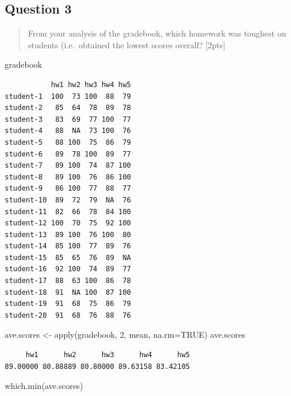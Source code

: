 \documentclass[
  letterpaper,
  DIV=11,
  numbers=noendperiod]{scrartcl}
\newenvironment{Shaded}{\begin{snugshade}}{\end{snugshade}}
\newcommand{\AttributeTok}[1]{\textcolor[rgb]{0.40,0.45,0.13}{#1}}
\newcommand{\ConstantTok}[1]{\textcolor[rgb]{0.56,0.35,0.01}{#1}}
\newcommand{\DecValTok}[1]{\textcolor[rgb]{0.68,0.00,0.00}{#1}}
\newcommand{\FunctionTok}[1]{\textcolor[rgb]{0.28,0.35,0.67}{#1}}
\newcommand{\NormalTok}[1]{\textcolor[rgb]{0.00,0.23,0.31}{#1}}
\newcommand{\OtherTok}[1]{\textcolor[rgb]{0.00,0.23,0.31}{#1}}
\begin{document}
\hypertarget{question-3}{%
\subsection{Question 3}\label{question-3}}

\begin{quote}
From your analysis of the gradebook, which homework was toughest on
students (i.e.~obtained the lowest scores overall? {[}2pts{]}
\end{quote}

\begin{Shaded}
\begin{Highlighting}[]
\NormalTok{gradebook}
\end{Highlighting}
\end{Shaded}

\begin{verbatim}
           hw1 hw2 hw3 hw4 hw5
student-1  100  73 100  88  79
student-2   85  64  78  89  78
student-3   83  69  77 100  77
student-4   88  NA  73 100  76
student-5   88 100  75  86  79
student-6   89  78 100  89  77
student-7   89 100  74  87 100
student-8   89 100  76  86 100
student-9   86 100  77  88  77
student-10  89  72  79  NA  76
student-11  82  66  78  84 100
student-12 100  70  75  92 100
student-13  89 100  76 100  80
student-14  85 100  77  89  76
student-15  85  65  76  89  NA
student-16  92 100  74  89  77
student-17  88  63 100  86  78
student-18  91  NA 100  87 100
student-19  91  68  75  86  79
student-20  91  68  76  88  76
\end{verbatim}

\begin{Shaded}
\begin{Highlighting}[]
\NormalTok{ave.scores }\OtherTok{\textless{}{-}} \FunctionTok{apply}\NormalTok{(gradebook, }\DecValTok{2}\NormalTok{, mean, }\AttributeTok{na.rm=}\ConstantTok{TRUE}\NormalTok{)}
\NormalTok{ave.scores}
\end{Highlighting}
\end{Shaded}

\begin{verbatim}
     hw1      hw2      hw3      hw4      hw5 
89.00000 80.88889 80.80000 89.63158 83.42105 
\end{verbatim}

\begin{Shaded}
\begin{Highlighting}[]
\FunctionTok{which.min}\NormalTok{(ave.scores)}
\end{Highlighting}
\end{Shaded}
\end{document}
